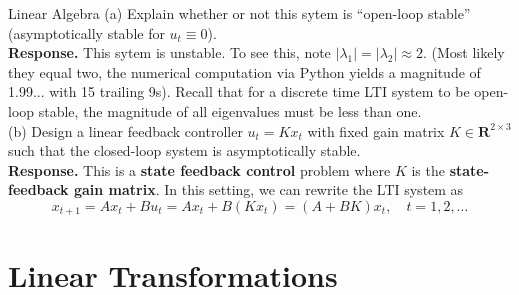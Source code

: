 \begin{chapter}{Linear Algebra}
    \noindent (a) Explain whether or not this sytem is ``open-loop stable'' (asymptotically stable for $u_t \equiv 0$).\\
    \noindent \textbf{Response.} This sytem is unstable. To see this, note $\left| \lambda_1 \right| = \left| \lambda_2 \right| \approx 2$.
    (Most likely they equal two, the numerical computation via Python yields a magnitude of 1.99... with 15 trailing 9s). Recall
    that for a discrete time LTI system to be open-loop stable, the magnitude of all eigenvalues must be less than one.\\
    \noindent (b) Design a linear feedback controller $u_t = Kx_t$ with fixed gain matrix $K \in \mathbf{R}^{2 \times 3}$ such
    that the closed-loop system is asymptotically stable.\\
    \textbf{Response.} This is a \textbf{state feedback control} problem where $K$ is the \textbf{state-feedback gain matrix}.
    In this setting, we can rewrite the LTI system as %
    \[x_{t+1} = Ax_t + Bu_t = Ax_t + B(Kx_t) = (A + BK)x_t, \quad t=1, 2, \ldots\]

    \section{Linear Transformations}
    
\end{chapter}